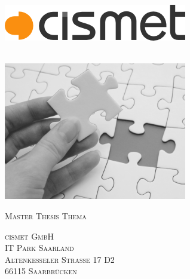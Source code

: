 \begin{titlepage}
\AddToShipoutPicture*{\BackgroundPic}
\hfill
\begin{minipage}[t]{0.5\textwidth}
	\begin{flushright}
	\includegraphics[width=\textwidth]{img/logo_cismet_grey}
	\end{flushright}
\end{minipage}
~\\[1cm]
\includegraphics[width=0.6\textwidth]{img/puzzleGrey}
~\\[1cm]

\begin{flushright}
\textsc{\Large Master Thesis Thema}

\vfill

\textsc{cismet GmbH}
\\[0.5cm]
\textsc{IT Park Saarland}\\
\textsc{Altenkesseler Straße 17 D2}\\
\textsc{66115 Saarbrücken}\\
\end{flushright}


\end{titlepage}
\restoregeometry

